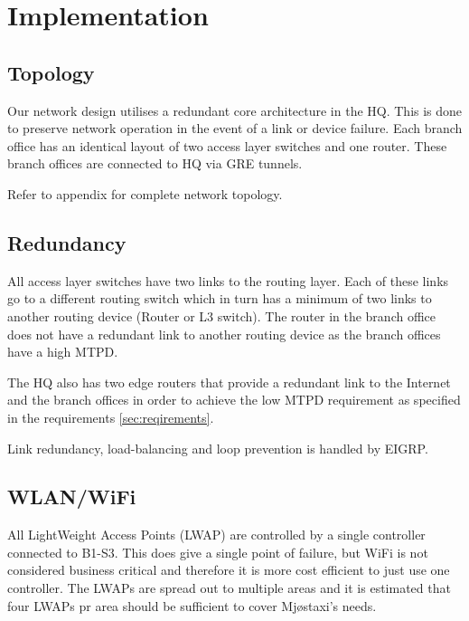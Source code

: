 \chapter{Implementation}
\label{chap:implementation}

\section{Topology}
Our network design utilises a redundant core architecture in the HQ.
This is done to preserve network operation in the event of a link or device failure.
Each branch office has an identical layout of two access layer switches and one router.
These branch offices are connected to HQ via GRE tunnels.

Refer to appendix  for complete network topology.

\section{Redundancy}
All access layer switches have two links to the routing layer. 
Each of these links go to a different routing switch which in turn has a minimum of two links to another routing device (Router or L3 switch).
The router in the branch office does not have a redundant link to another routing device as the branch offices have a high MTPD.

The HQ also has two edge routers that provide a redundant link to the Internet and the branch offices in order to achieve the low MTPD requirement as specified in the requirements \ref{sec:reqirements}.

Link redundancy, load-balancing and loop prevention is handled by EIGRP.

\section{WLAN/WiFi}
All LightWeight Access Points (LWAP) are controlled by a single controller connected to B1-S3.
This does give a single point of failure, but WiFi is not considered business critical and therefore it is more cost efficient to just use one controller.
The LWAPs are spread out to multiple areas and it is estimated that four LWAPs pr area should be sufficient to cover Mjøstaxi's needs.